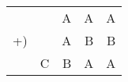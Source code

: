 \documentclass{article}
\begin{document}
\begin{tabular}{rrrrr}
     &   & A & A & A \\
  +) &   & A & B & B \\
  \hline
     & C & B & A & A
\end{tabular}
\end{document}
